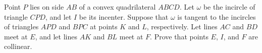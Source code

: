Point $P$ lies on side $AB$ of a convex quadrilateral $ABCD$. Let $\omega$ be the incircle of triangle $CPD$, and let $I$ be its incenter. Suppose that $\omega$ is tangent to the incircles of triangles $APD$ and $BPC$ at points $K$ and $L$, respectively. Let lines $AC$ and $BD$ meet at $E$, and let lines $AK$ and $BL$ meet at $F$. Prove that points $E$, $I$, and $F$ are collinear.
